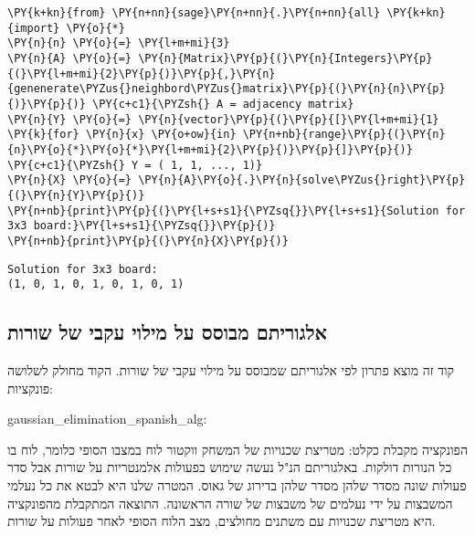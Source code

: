 \begin{english}
    \begin{tcolorbox}[breakable, size=fbox, boxrule=1pt, pad at break*=1mm,colback=cellbackground, colframe=cellborder]
\begin{Verbatim}[commandchars=\\\{\}]
\PY{k+kn}{from} \PY{n+nn}{sage}\PY{n+nn}{.}\PY{n+nn}{all} \PY{k+kn}{import} \PY{o}{*}
\PY{n}{n} \PY{o}{=} \PY{l+m+mi}{3}
\PY{n}{A} \PY{o}{=} \PY{n}{Matrix}\PY{p}{(}\PY{n}{Integers}\PY{p}{(}\PY{l+m+mi}{2}\PY{p}{)}\PY{p}{,}\PY{n}{genenerate\PYZus{}neighbord\PYZus{}matrix}\PY{p}{(}\PY{n}{n}\PY{p}{)}\PY{p}{)} \PY{c+c1}{\PYZsh{} A = adjacency matrix}
\PY{n}{Y} \PY{o}{=} \PY{n}{vector}\PY{p}{(}\PY{p}{[}\PY{l+m+mi}{1} \PY{k}{for} \PY{n}{x} \PY{o+ow}{in} \PY{n+nb}{range}\PY{p}{(}\PY{n}{n}\PY{o}{*}\PY{o}{*}\PY{l+m+mi}{2}\PY{p}{)}\PY{p}{]}\PY{p}{)} \PY{c+c1}{\PYZsh{} Y = ( 1, 1, ..., 1)}
\PY{n}{X} \PY{o}{=} \PY{n}{A}\PY{o}{.}\PY{n}{solve\PYZus{}right}\PY{p}{(}\PY{n}{Y}\PY{p}{)}
\PY{n+nb}{print}\PY{p}{(}\PY{l+s+s1}{\PYZsq{}}\PY{l+s+s1}{Solution for 3x3 board:}\PY{l+s+s1}{\PYZsq{}}\PY{p}{)}
\PY{n+nb}{print}\PY{p}{(}\PY{n}{X}\PY{p}{)}
\end{Verbatim}
\end{tcolorbox}

    \begin{Verbatim}[commandchars=\\\{\}]
Solution for 3x3 board:
(1, 0, 1, 0, 1, 0, 1, 0, 1)
    \end{Verbatim}
\end{english}

\newpage
    \hypertarget{solver-based-on-calculating-raw-by-raw}{%
\subsection{אלגוריתם מבוסס על מילוי עקבי של שורות}\label{solver-based-on-calculating-raw-by-raw}}
קוד זה מוצא פתרון לפי אלגוריתם שמבוסס על מילוי עקבי של שורות.
הקוד מחולק לשלושה פונקציות:

\begin{english}
    gaussian\_elimination\_spanish\_alg:
\end{english}

הפונקציה מקבלת כקלט:
מטריצת שכנויות של המשחק ווקטור לוח במצבו הסופי כלומר, לוח בו כל הנורות דולקות.
באלגוריתם הנ"ל נעשה שימוש בפעולות אלמנטריות על שורות אבל סדר פעולות שונה 
מסדר שלהן מסדר  שלהן בדירוג של גאוס.
המטרה שלנו היא לבטא את כל נעלמי המשבצות על ידי נעלמים של משבצות של שורה הראשונה.
התוצאה המתקבלת מהפונקציה היא 
מטריצת שכנויות עם משתנים מחולצים,
מצב הלוח הסופי לאחר פעולות על שורות.


